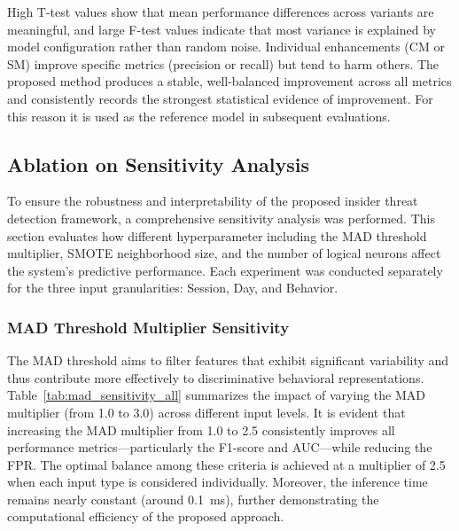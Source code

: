 High T-test values show that mean performance differences across variants are meaningful, and large F-test values indicate that most variance is explained by model configuration rather than random noise. Individual enhancements (CM or SM) improve specific metrics (precision or recall) but tend to harm others. The proposed method produces a stable, well-balanced improvement across all metrics and consistently records the strongest statistical evidence of improvement. For this reason it is used as the reference model in subsequent evaluations.

\subsection{Ablation on Sensitivity Analysis}
To ensure the robustness and interpretability of the proposed insider threat detection framework, a comprehensive sensitivity analysis was performed. This section evaluates how different hyperparameter including the MAD threshold multiplier, SMOTE neighborhood size, and the number of logical neurons affect the system’s predictive performance. Each experiment was conducted separately for the three input granularities: Session, Day, and Behavior. 

\subsubsection{MAD Threshold Multiplier Sensitivity}
The MAD threshold aims to filter features that exhibit significant variability and thus contribute more effectively to discriminative behavioral representations. Table~\ref{tab:mad_sensitivity_all} summarizes the impact of varying the MAD multiplier (from 1.0 to 3.0) across different input levels. It is evident that increasing the MAD multiplier from 1.0 to 2.5 consistently improves all performance metrics—particularly the F1-score and AUC—while reducing the FPR. The optimal balance among these criteria is achieved at a multiplier of 2.5 when each input type is considered individually. Moreover, the inference time remains nearly constant (around 0.1~ms), further demonstrating the computational efficiency of the proposed approach.
‌


